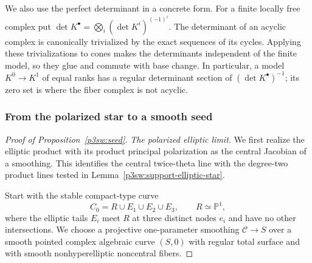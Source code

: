 \documentclass[11pt]{article}
\numberwithin{equation}{section}
\begin{document}
We also use the perfect determinant in a concrete form.  For a finite
locally free complex put
\(\det K^\bullet=\bigotimes_i(\det K^i)^{(-1)^i}\).
The determinant of an acyclic complex is canonically trivialized by
the exact sequences of its cycles.  Applying these trivializations to
cones makes the determinants independent of the finite model, so they
glue and commute with base change.  In particular, a model
\(K^0\to K^1\) of equal ranks has a regular determinant section of
\((\det K^\bullet)^{-1}\); its zero set is where the fiber complex is
not acyclic.

\subsubsection{From the polarized star to a smooth seed}

\begin{proof}[Proof of Proposition~\ref{p3sw:seed}]
\emph{The polarized elliptic limit.}
We first realize the elliptic product with its product principal
polarization as the central Jacobian of a smoothing.  This identifies
the central twice-theta line with the degree-two product lines tested
in Lemma~\ref{p3sw:support-elliptic-star}.

Start with the stable compact-type curve
\begin{equation}
 C_0=R\cup E_1\cup E_2\cup E_3,\qquad R\simeq\mathbb P^1,
 \label{p3sw:support-compact-type-curve}
\end{equation}
where the elliptic tails \(E_i\) meet \(R\) at three distinct nodes
\(e_i\) and have no other intersections.  We choose a projective
one-parameter smoothing \(\mathcal C\to S\) over a smooth pointed
complex algebraic curve \((S,0)\) with regular total surface and with
smooth nonhyperelliptic noncentral fibers.


\end{proof}
\end{document}
